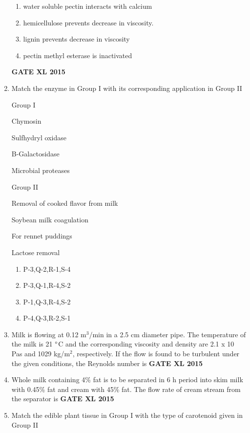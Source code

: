 \documentclass[journal,12pt,onecolumn]{IEEEtran}
\begin{document}
\begin{enumerate}
    \begin{enumerate}
            \item water soluble pectin interacts with calcium
	    \item hemicellulose prevents decrease in viscosity.
	    \item lignin prevents decrease in viscosity
            \item pectin methyl esterase is inactivated
    \end{enumerate}
\hfill{\textbf{GATE XL 2015}}
\item {Match the enzyme in Group I with its corresponding application in Group II}

	\begin{minipage}{0.5\textwidth}\begin{flushleft}
Group I

 Chymosin

 Sulfhydryl oxidase

 B-Galactosidase

 Microbial proteases
	\end{flushleft}
	\end{minipage}
	\begin{minipage}{0.5\textwidth}\begin{flushleft}
Group II

 Removal of cooked flavor from milk

 Soybean milk coagulation

 For rennet puddings

 Lactose removal
	\end{flushleft}

	\end{minipage}

    \begin{enumerate}
            \item P-3,Q-2,R-1,S-4
            \item P-3,Q-1,R-4,S-2
            \item P-1,Q-3,R-4,S-2
            \item P-4,Q-3,R-2,S-1
    \end{enumerate}
\item Milk is flowing at 0.12 m$^3$/min in a 2.5 cm diameter pipe. The temperature of the milk is 21 $\degree$C and the corresponding viscosity and density are 2.1 x 10 Pas and 1029 kg/m$^2$, respectively. If the flow is found to be turbulent under the given conditions, the Reynolds number is
\hfill{\textbf{GATE XL 2015}}
\item Whole milk  containing 4\% fat is to be separated in 6 h period into skim milk with 0.45\% fat and cream with 45\% fat. The flow rate of cream stream  from the separator is
\hfill{\textbf{GATE XL 2015}}
\item Match the edible plant tissue in Group I with the type of carotenoid given in Group II


\end{enumerate}
\end{document}
